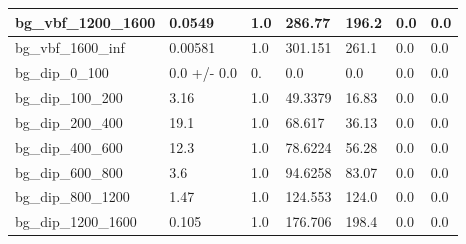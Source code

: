 \documentclass[a4paper, 10pt]{article}
\begin{document}
\begin{table}[H]
\begin{center}
\begin{tabular}{|m{23.0mm}|m{23.0mm}|m{18.0mm}|m{19.0mm}|m{19.0mm}|m{19.0mm}|m{19.0mm}|}
      \hline
      {\cellcolor{white}         bg\_vbf\_1200\_1600}& {\cellcolor{white}         0.0549}& {\cellcolor{white}         1.0}& {\cellcolor{white}         286.77}& {\cellcolor{white}         196.2}& {\cellcolor{green}         0.0}& {\cellcolor{green}         0.0}\\
      \hline
      {\cellcolor{white}         bg\_vbf\_1600\_inf}& {\cellcolor{white}         0.00581}& {\cellcolor{white}         1.0}& {\cellcolor{white}         301.151}& {\cellcolor{white}         261.1}& {\cellcolor{green}         0.0}& {\cellcolor{green}         0.0}\\
      \hline
      {\cellcolor{white}         bg\_dip\_0\_100}& {\cellcolor{white}         0.0 +/\-- 0.0}& {\cellcolor{white}         0.}& {\cellcolor{white}         0.0}& {\cellcolor{white}         0.0}& {\cellcolor{green}         0.0}& {\cellcolor{green}         0.0}\\
      \hline
      {\cellcolor{white}         bg\_dip\_100\_200}& {\cellcolor{white}         3.16}& {\cellcolor{white}         1.0}& {\cellcolor{white}         49.3379}& {\cellcolor{white}         16.83}& {\cellcolor{green}         0.0}& {\cellcolor{green}         0.0}\\
      \hline
      {\cellcolor{white}         bg\_dip\_200\_400}& {\cellcolor{white}         19.1}& {\cellcolor{white}         1.0}& {\cellcolor{white}         68.617}& {\cellcolor{white}         36.13}& {\cellcolor{green}         0.0}& {\cellcolor{green}         0.0}\\
      \hline
      {\cellcolor{white}         bg\_dip\_400\_600}& {\cellcolor{white}         12.3}& {\cellcolor{white}         1.0}& {\cellcolor{white}         78.6224}& {\cellcolor{white}         56.28}& {\cellcolor{green}         0.0}& {\cellcolor{green}         0.0}\\
      \hline
      {\cellcolor{white}         bg\_dip\_600\_800}& {\cellcolor{white}         3.6}& {\cellcolor{white}         1.0}& {\cellcolor{white}         94.6258}& {\cellcolor{white}         83.07}& {\cellcolor{green}         0.0}& {\cellcolor{green}         0.0}\\
      \hline
      {\cellcolor{white}         bg\_dip\_800\_1200}& {\cellcolor{white}         1.47}& {\cellcolor{white}         1.0}& {\cellcolor{white}         124.553}& {\cellcolor{white}         124.0}& {\cellcolor{green}         0.0}& {\cellcolor{green}         0.0}\\
      \hline
      {\cellcolor{white}         bg\_dip\_1200\_1600}& {\cellcolor{white}         0.105}& {\cellcolor{white}         1.0}& {\cellcolor{white}         176.706}& {\cellcolor{white}         198.4}& {\cellcolor{green}         0.0}& {\cellcolor{green}         0.0}\\

\end{tabular}
\end{center}
\end{table}
\end{document}
